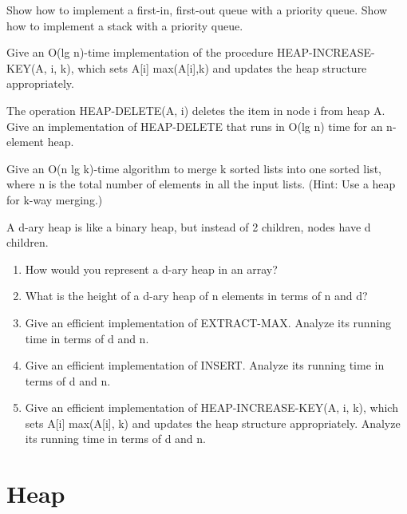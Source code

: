 \begin{problem}
Show how to implement a first-in, first-out queue with a priority queue. Show how to implement a stack with a priority queue.
\end{problem}


\begin{problem}

Give an O(lg n)-time implementation of the procedure HEAP-INCREASE-KEY(A, i, k), which sets A[i]  max(A[i],k) and updates the heap structure appropriately.
\end{problem}

\begin{problem}

The operation HEAP-DELETE(A, i) deletes the item in node i from heap A. Give an implementation of HEAP-DELETE that runs in O(lg n) time for an n-element heap.
\end{problem}

\begin{problem}

Give an O(n lg k)-time algorithm to merge k sorted lists into one sorted list, where n is the total number of elements in all the input lists. (Hint: Use a heap for k-way merging.)
\end{problem}


\begin{problem}

A d-ary heap is like a binary heap, but instead of 2 children, nodes have d children.
\begin{enumerate}
\item How would you represent a d-ary heap in an array?
\item What is the height of a d-ary heap of n elements in terms of n and d?
\item Give an efficient implementation of EXTRACT-MAX. Analyze its running time in terms of d and n.
\item Give an efficient implementation of INSERT. Analyze its running time in terms of d and n.
\item Give an efficient implementation of HEAP-INCREASE-KEY(A, i, k), which sets A[i]  max(A[i], k) and updates the heap structure appropriately. Analyze its running time in terms of d and n.
\end{enumerate}
\end{problem}








\chapter{Heap}


